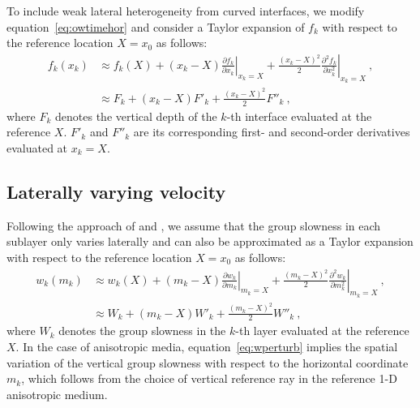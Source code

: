 To include weak lateral heterogeneity from curved interfaces, we modify equation~\ref{eq:owtimehor} and consider a Taylor expansion of $f_k$ with respect to the reference location $X=x_0$ as follows:
\begin{align}
\label{eq:fperturb}
f_k(x_k) &\approx f_k(X) + (x_k-X) \left.\frac{\partial f_k}{\partial x_k}\right\rvert_{x_k=X} + \frac{(x_k-X)^2}{2} \left.\frac{\partial^2 f_k}{\partial x_k^2}\right\rvert_{x_k=X}~, \\
\nonumber
 &\approx F_k + (x_k-X)F'_k + \frac{(x_k-X)^2 }{2}F''_k~,
\end{align}
where $F_k$ denotes the vertical depth of the $k$-th interface evaluated at the reference $X$. $F'_k$ and $F''_k$ are its corresponding first- and second-order derivatives evaluated at $x_k = X$.

\subsection{Laterally varying velocity}

Following the approach of \cite{lynnclaerbout} and \cite{grechkatsvankinlatvar}, we assume that the group slowness in each sublayer only varies laterally and can also be approximated as a Taylor expansion with respect to the reference location $X=x_0$ as follows:
\begin{align}
\label{eq:wperturb}
w_k(m_k) &\approx w_k(X) + (m_k-X) \left.\frac{\partial w_k}{\partial m_k}\right\rvert_{m_k=X} + \frac{(m_k-X)^2}{2} \left.\frac{\partial^2 w_k}{\partial m_k^2}\right\rvert_{m_k=X}~, \\
\nonumber
 &\approx W_k + (m_k-X)W'_k + \frac{(m_k-X)^2 }{2}W''_k~,
\end{align}
where $W_k$ denotes the group slowness in the $k$-th layer evaluated at the reference $X$.
In the case of anisotropic media, equation~\ref{eq:wperturb} implies the spatial variation of the vertical group slowness with respect to the horizontal coordinate $m_k$, which follows from the choice of vertical reference ray in the reference 1-D anisotropic medium.

